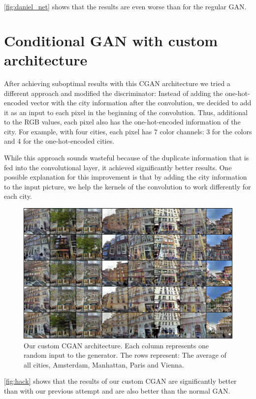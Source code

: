 \documentclass[a4paper]{article}
\begin{document}
\autoref{fig:daniel_net} shows that the results are even worse than for the regular GAN.

\section{Conditional GAN with custom architecture} 

After achieving suboptimal results with this CGAN architecture we tried a different approach and modified the discriminator: Instead of adding the one-hot-encoded vector with the city information after the convolution, we decided to add it as an input to each pixel in the beginning of the convolution. Thus, additional to the RGB values, each pixel also has the one-hot-encoded information of the city. For example, with four cities, each pixel has 7 color channels: 3 for the colors and 4 for the one-hot-encoded cities. 

While this approach sounds wasteful because of the duplicate information that is fed into the convolutional layer, it achieved significantly better results. One possible explanation for this improvement is that by adding the city information to the input picture, we help the kernels of the convolution to work differently for each city. 

\begin{figure}[h]
\includegraphics[width=\columnwidth]{figures/good_hack_final.png}
\caption{Our custom CGAN architecture. Each column represents one random input to the generator. The rows represent: The average of all cities, Amsterdam, Manhattan, Paris and Vienna.}
\label{fig:hack}
\end{figure}

\autoref{fig:hack} shows that the results of our custom CGAN are significantly better than with our previous attempt and are also better than the normal GAN. 
\end{document}
